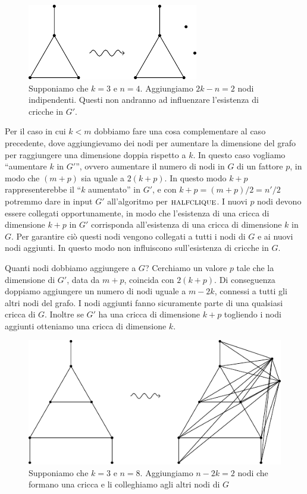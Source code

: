 \begin{figure}[h]
    \begin{center}
        \includegraphics{./img/NPClass/CLIHCLI1.pdf}
        \caption{Supponiamo che $k=3$ e $n=4$. Aggiungiamo $2k-n = 2$ nodi indipendenti. Questi non
        andranno ad influenzare l'esistenza di cricche in $G'$.}
    \end{center}
\end{figure}

Per il caso in cui $k < m$ dobbiamo fare una cosa complementare al caso precedente, dove
aggiungievamo dei nodi per aumentare la dimensione del grafo per raggiungere una dimensione doppia
rispetto a $k$. In questo caso vogliamo ``aumentare $k$ in $G'$'', ovvero aumentare il numero di
nodi in $G$ di un fattore $p$, in modo che $(m+p)$ sia uguale a $2(k+p)$. In questo modo $k + p$
rappresenterebbe il ``$k$ aumentato'' in $G'$, e con $k+p = (m+p)/2 = n'/2$ potremmo dare in input
$G'$ all'algoritmo per $\textsc{halfclique}$. I nuovi $p$ nodi devono essere collegati opportunamente, in
modo che l'esistenza di una cricca di dimensione $k+p$ in $G'$ corrisponda all'esistenza di una
cricca di dimensione $k$ in $G$. Per garantire ciò questi nodi vengono collegati a tutti i nodi di
$G$ e ai nuovi nodi aggiunti. In questo modo non influiscono sull'esistenza di cricche in $G$.

Quanti nodi dobbiamo aggiungere a $G$? Cerchiamo un valore $p$ tale che la dimensione di $G'$, data
da $m + p$, coincida con $2(k + p)$. Di conseguenza doppiamo aggiungere un numero di nodi uguale a
$m - 2k$, connessi a tutti gli altri nodi del grafo. I nodi aggiunti fanno sicuramente parte di una
qualsiasi cricca di $G$. Inoltre se $G'$ ha una cricca di dimensione $k+p$ togliendo i nodi aggiunti
otteniamo una cricca di dimensione $k$.

\begin{figure}[h]
    \begin{center}
        \includegraphics{./img/NPClass/CLIHCLI2.pdf}
        \caption{Supponiamo che $k=3$ e $n=8$. Aggiungiamo $n-2k = 2$ nodi che formano una cricca e
            li colleghiamo agli altri nodi di $G$}
    \end{center}
\end{figure}

